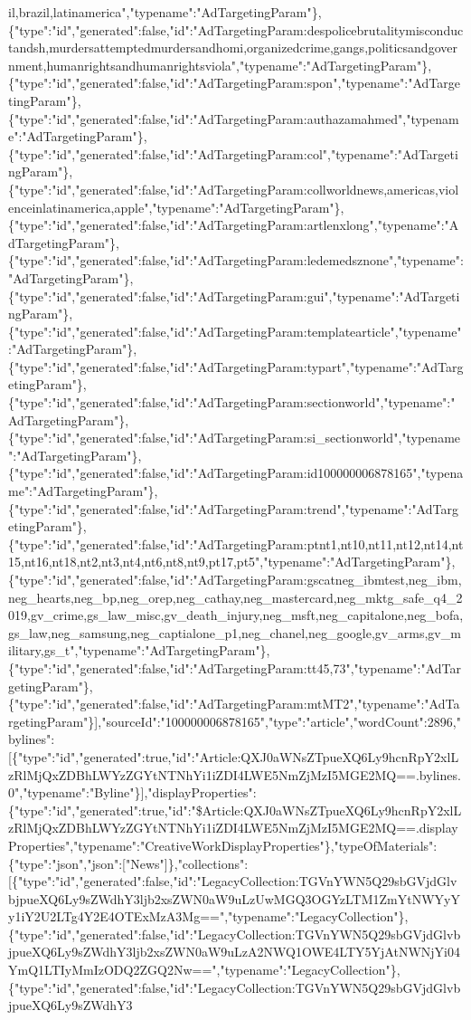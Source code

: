 il,brazil,latinamerica","typename":"AdTargetingParam"\},\{"type":"id","generated":false,"id":"AdTargetingParam:despolicebrutalitymisconductandsh,murdersattemptedmurdersandhomi,organizedcrime,gangs,politicsandgovernment,humanrightsandhumanrightsviola","typename":"AdTargetingParam"\},\{"type":"id","generated":false,"id":"AdTargetingParam:spon","typename":"AdTargetingParam"\},\{"type":"id","generated":false,"id":"AdTargetingParam:authazamahmed","typename":"AdTargetingParam"\},\{"type":"id","generated":false,"id":"AdTargetingParam:col","typename":"AdTargetingParam"\},\{"type":"id","generated":false,"id":"AdTargetingParam:collworldnews,americas,violenceinlatinamerica,apple","typename":"AdTargetingParam"\},\{"type":"id","generated":false,"id":"AdTargetingParam:artlenxlong","typename":"AdTargetingParam"\},\{"type":"id","generated":false,"id":"AdTargetingParam:ledemedsznone","typename":"AdTargetingParam"\},\{"type":"id","generated":false,"id":"AdTargetingParam:gui","typename":"AdTargetingParam"\},\{"type":"id","generated":false,"id":"AdTargetingParam:templatearticle","typename":"AdTargetingParam"\},\{"type":"id","generated":false,"id":"AdTargetingParam:typart","typename":"AdTargetingParam"\},\{"type":"id","generated":false,"id":"AdTargetingParam:sectionworld","typename":"AdTargetingParam"\},\{"type":"id","generated":false,"id":"AdTargetingParam:si\_sectionworld","typename":"AdTargetingParam"\},\{"type":"id","generated":false,"id":"AdTargetingParam:id100000006878165","typename":"AdTargetingParam"\},\{"type":"id","generated":false,"id":"AdTargetingParam:trend","typename":"AdTargetingParam"\},\{"type":"id","generated":false,"id":"AdTargetingParam:ptnt1,nt10,nt11,nt12,nt14,nt15,nt16,nt18,nt2,nt3,nt4,nt6,nt8,nt9,pt17,pt5","typename":"AdTargetingParam"\},\{"type":"id","generated":false,"id":"AdTargetingParam:gscatneg\_ibmtest,neg\_ibm,neg\_hearts,neg\_bp,neg\_orep,neg\_cathay,neg\_mastercard,neg\_mktg\_safe\_q4\_2019,gv\_crime,gs\_law\_misc,gv\_death\_injury,neg\_msft,neg\_capitalone,neg\_bofa,gs\_law,neg\_samsung,neg\_captialone\_p1,neg\_chanel,neg\_google,gv\_arms,gv\_military,gs\_t","typename":"AdTargetingParam"\},\{"type":"id","generated":false,"id":"AdTargetingParam:tt45,73","typename":"AdTargetingParam"\},\{"type":"id","generated":false,"id":"AdTargetingParam:mtMT2","typename":"AdTargetingParam"\}{]},"sourceId":"100000006878165","type":"article","wordCount":2896,"bylines":{[}\{"type":"id","generated":true,"id":"Article:QXJ0aWNsZTpueXQ6Ly9hcnRpY2xlLzRlMjQxZDBhLWYzZGYtNTNhYi1iZDI4LWE5NmZjMzI5MGE2MQ==.bylines.0","typename":"Byline"\}{]},"displayProperties":\{"type":"id","generated":true,"id":"\$Article:QXJ0aWNsZTpueXQ6Ly9hcnRpY2xlLzRlMjQxZDBhLWYzZGYtNTNhYi1iZDI4LWE5NmZjMzI5MGE2MQ==.displayProperties","typename":"CreativeWorkDisplayProperties"\},"typeOfMaterials":\{"type":"json","json":{[}"News"{]}\},"collections":{[}\{"type":"id","generated":false,"id":"LegacyCollection:TGVnYWN5Q29sbGVjdGlvbjpueXQ6Ly9sZWdhY3ljb2xsZWN0aW9uLzUwMGQ3OGYzLTM1ZmYtNWYyYy1iY2U2LTg4Y2E4OTExMzA3Mg==","typename":"LegacyCollection"\},\{"type":"id","generated":false,"id":"LegacyCollection:TGVnYWN5Q29sbGVjdGlvbjpueXQ6Ly9sZWdhY3ljb2xsZWN0aW9uLzA2NWQ1OWE4LTY5YjAtNWNjYi04YmQ1LTIyMmIzODQ2ZGQ2Nw==","typename":"LegacyCollection"\},\{"type":"id","generated":false,"id":"LegacyCollection:TGVnYWN5Q29sbGVjdGlvbjpueXQ6Ly9sZWdhY3